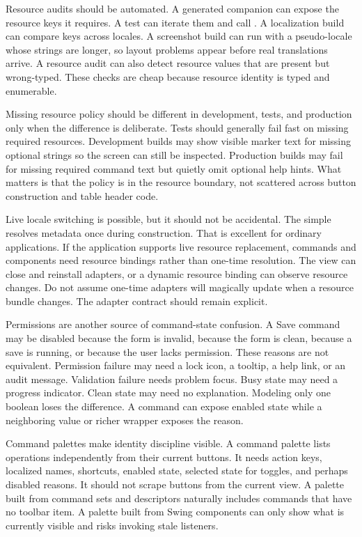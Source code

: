 Resource audits should be automated. A generated companion can expose the
resource keys it requires. A test can iterate them and call
. A localization build can compare keys across locales.
A screenshot build can run with a pseudo-locale whose strings are longer, so
layout problems appear before real translations arrive. A resource audit can
also detect resource values that are present but wrong-typed. These checks are
cheap because resource identity is typed and enumerable.

Missing resource policy should be different in development, tests, and
production only when the difference is deliberate. Tests should generally fail
fast on missing required resources. Development builds may show visible marker
text for missing optional strings so the screen can still be inspected.
Production builds may fail for missing required command text but quietly omit
optional help hints. What matters is that the policy is in the resource
boundary, not scattered across button construction and table header code.

Live locale switching is possible, but it should not be accidental. The simple
 resolves metadata once during construction. That is
excellent for ordinary applications. If the application supports live resource
replacement, commands and components need resource bindings rather than
one-time resolution. The view can close and reinstall adapters, or a dynamic
resource binding can observe resource changes. Do not assume one-time
adapters will magically update when a resource bundle changes. The adapter
contract should remain explicit.

Permissions are another source of command-state confusion. A Save command may
be disabled because the form is invalid, because the form is clean, because a
save is running, or because the user lacks permission. These reasons are not
equivalent. Permission failure may need a lock icon, a tooltip, a help link, or
an audit message. Validation failure needs problem focus. Busy state may need a
progress indicator. Clean state may need no explanation. Modeling only one
boolean loses the difference. A command can expose enabled state while a
neighboring value or richer wrapper exposes the reason.

Command palettes make identity discipline visible. A command palette lists
operations independently from their current buttons. It needs action keys,
localized names, shortcuts, enabled state, selected state for toggles, and
perhaps disabled reasons. It should not scrape buttons from the current view.
A palette built from command sets and descriptors naturally includes commands
that have no toolbar item. A palette built from Swing components can only show
what is currently visible and risks invoking stale listeners.

